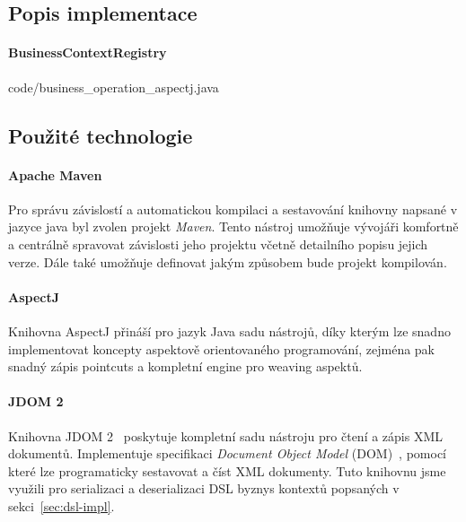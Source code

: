 \subsection{Popis implementace}

\paragraph{BusinessContextRegistry}


{code/business_operation_aspectj.java}

\subsection{Použité technologie}

\paragraph{Apache Maven}

Pro správu závislostí a automatickou kompilaci a sestavování
knihovny napsané v jazyce java byl zvolen projekt \textit{Maven}. %
Tento nástroj umožňuje vývojáři komfortně a centrálně
spravovat závislosti jeho projektu včetně detailního
popisu jejich verze. Dále také umožňuje definovat jakým
způsobem bude projekt kompilován.

\paragraph{AspectJ}

Knihovna AspectJ přináší pro jazyk Java sadu nástrojů,
díky kterým lze snadno implementovat koncepty aspektově orientovaného
programování, zejména pak snadný zápis pointcuts a kompletní
engine pro weaving aspektů.


\paragraph{JDOM 2}

Knihovna JDOM 2~\cite{jdom2} poskytuje
kompletní sadu nástroju pro čtení a zápis XML dokumentů.
Implementuje specifikaci \textit{Document Object Model} (DOM)~\cite{wood2004document},
pomocí které lze programaticky sestavovat a číst XML dokumenty.
Tuto knihovnu jsme využili pro serializaci a deserializaci
DSL byznys kontextů popsaných v sekci~\ref{sec:dsl-impl}.

